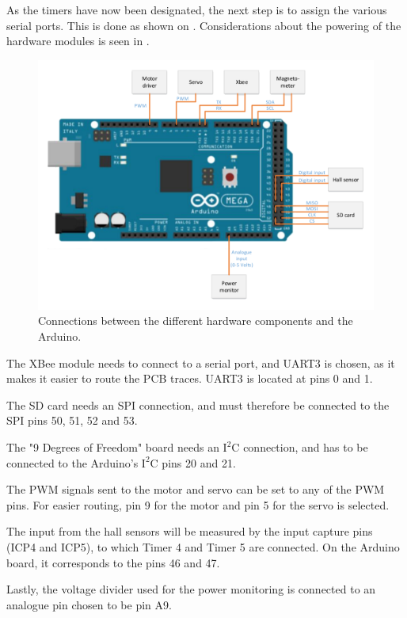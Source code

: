 As the timers have now been designated, the next step is to assign the various serial ports. This is done as shown on . Considerations about the powering of the hardware modules is seen in .	


\begin{figure}[H]
	\centering
	\includegraphics[scale=0.75]{figures/MegaSetup.pdf}
	\caption{Connections between the different hardware components and the Arduino.}
	\label{MegaSetup}
\end{figure}

The XBee module needs to connect to a serial port, and UART3 is chosen, as it makes it easier to route the PCB traces. UART3 is located at pins 0 and 1. 

The SD card needs an SPI connection, and must therefore be connected to the SPI pins 50, 51, 52 and 53. 

The "9 Degrees of Freedom" board needs an $\text{I}^2\text{C}$ connection, and has to be connected to the Arduino's $\text{I}^2\text{C}$ pins 20 and 21. 

The PWM signals sent to the motor and servo can be set to any of the PWM pins. For easier routing, pin 9 for the motor and pin 5 for the servo is selected.

The input from the hall sensors will be measured by the input capture pins (ICP4 and ICP5), to which Timer 4 and Timer 5 are connected. On the Arduino board, it corresponds to the pins 46 and 47.

Lastly, the voltage divider used for the power monitoring is connected to an analogue pin chosen to be pin A9.

